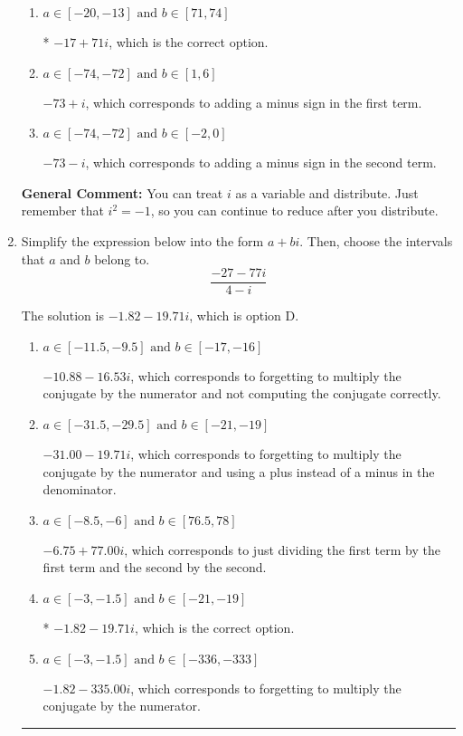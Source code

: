 \documentclass{extbook}[14pt]
\newcommand{\litem}[1]{\item #1

\rule{\textwidth}{0.4pt}}
\begin{document}
\begin{enumerate}
{\begin{enumerate}[label=\Alph*.]
 $-45 - 28 i$, which corresponds to just multiplying the real terms to get the real part of the solution and the coefficients in the complex terms to get the complex part.
\item \( a \in [-20, -13] \text{ and } b \in [71, 74] \)

* $-17 + 71 i$, which is the correct option.
\item \( a \in [-74, -72] \text{ and } b \in [1, 6] \)

 $-73 + i$, which corresponds to adding a minus sign in the first term.
\item \( a \in [-74, -72] \text{ and } b \in [-2, 0] \)

 $-73 - i$, which corresponds to adding a minus sign in the second term.
\end{enumerate}

\textbf{General Comment:} You can treat $i$ as a variable and distribute. Just remember that $i^2=-1$, so you can continue to reduce after you distribute.
}
\litem{
Simplify the expression below into the form $a+bi$. Then, choose the intervals that $a$ and $b$ belong to.
\[ \frac{-27 - 77 i}{4 - i} \]

The solution is \( -1.82  - 19.71 i \), which is option D.\begin{enumerate}[label=\Alph*.]
\item \( a \in [-11.5, -9.5] \text{ and } b \in [-17, -16] \)

 $-10.88  - 16.53 i$, which corresponds to forgetting to multiply the conjugate by the numerator and not computing the conjugate correctly.
\item \( a \in [-31.5, -29.5] \text{ and } b \in [-21, -19] \)

 $-31.00  - 19.71 i$, which corresponds to forgetting to multiply the conjugate by the numerator and using a plus instead of a minus in the denominator.
\item \( a \in [-8.5, -6] \text{ and } b \in [76.5, 78] \)

 $-6.75  + 77.00 i$, which corresponds to just dividing the first term by the first term and the second by the second.
\item \( a \in [-3, -1.5] \text{ and } b \in [-21, -19] \)

* $-1.82  - 19.71 i$, which is the correct option.
\item \( a \in [-3, -1.5] \text{ and } b \in [-336, -333] \)

 $-1.82  - 335.00 i$, which corresponds to forgetting to multiply the conjugate by the numerator.
\end{enumerate}

}
\end{enumerate}
\end{document}
